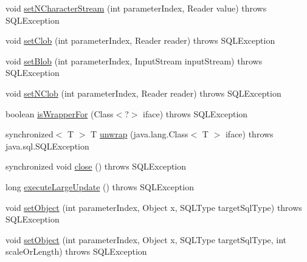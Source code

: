 \begin{DoxyCompactItemize}
\item 
void \mbox{\hyperlink{classcom_1_1mysql_1_1cj_1_1jdbc_1_1_prepared_statement_wrapper_a8ab9e8d5624c617053ec45a5617abfa9}{set\+N\+Character\+Stream}} (int parameter\+Index, Reader value)  throws S\+Q\+L\+Exception 
\item 
void \mbox{\hyperlink{classcom_1_1mysql_1_1cj_1_1jdbc_1_1_prepared_statement_wrapper_a64703007d7d7d4ea029abbb7d0142cf0}{set\+Clob}} (int parameter\+Index, Reader reader)  throws S\+Q\+L\+Exception 
\item 
void \mbox{\hyperlink{classcom_1_1mysql_1_1cj_1_1jdbc_1_1_prepared_statement_wrapper_acfe0423c4e0623d4ca16f9c6b7f49fa5}{set\+Blob}} (int parameter\+Index, Input\+Stream input\+Stream)  throws S\+Q\+L\+Exception 
\item 
void \mbox{\hyperlink{classcom_1_1mysql_1_1cj_1_1jdbc_1_1_prepared_statement_wrapper_aa9a25fc276aacea5dc108eaf37e2d3c9}{set\+N\+Clob}} (int parameter\+Index, Reader reader)  throws S\+Q\+L\+Exception 
\item 
boolean \mbox{\hyperlink{classcom_1_1mysql_1_1cj_1_1jdbc_1_1_prepared_statement_wrapper_a316f20ff93887f64bc06e86eac294a38}{is\+Wrapper\+For}} (Class$<$?$>$ iface)  throws S\+Q\+L\+Exception 
\item 
synchronized$<$ T $>$ T \mbox{\hyperlink{classcom_1_1mysql_1_1cj_1_1jdbc_1_1_prepared_statement_wrapper_aa3017e3af24221f89c4eac71808024c2}{unwrap}} (java.\+lang.\+Class$<$ T $>$ iface)  throws java.\+sql.\+S\+Q\+L\+Exception 
\item 
synchronized void \mbox{\hyperlink{classcom_1_1mysql_1_1cj_1_1jdbc_1_1_prepared_statement_wrapper_a4e6ee6803aa0ab8bd8f1b54b1a16042b}{close}} ()  throws S\+Q\+L\+Exception 
\item 
long \mbox{\hyperlink{classcom_1_1mysql_1_1cj_1_1jdbc_1_1_prepared_statement_wrapper_a7a9dc4ef722d9b5288f0a073168d88c1}{execute\+Large\+Update}} ()  throws S\+Q\+L\+Exception 
\item 
void \mbox{\hyperlink{classcom_1_1mysql_1_1cj_1_1jdbc_1_1_prepared_statement_wrapper_a24ea6d1115676790b5c44fbe201b3347}{set\+Object}} (int parameter\+Index, Object x, S\+Q\+L\+Type target\+Sql\+Type)  throws S\+Q\+L\+Exception 
\item 
void \mbox{\hyperlink{classcom_1_1mysql_1_1cj_1_1jdbc_1_1_prepared_statement_wrapper_ae5e27f956733d367f94bf5749114dd51}{set\+Object}} (int parameter\+Index, Object x, S\+Q\+L\+Type target\+Sql\+Type, int scale\+Or\+Length)  throws S\+Q\+L\+Exception 
\end{DoxyCompactItemize}
